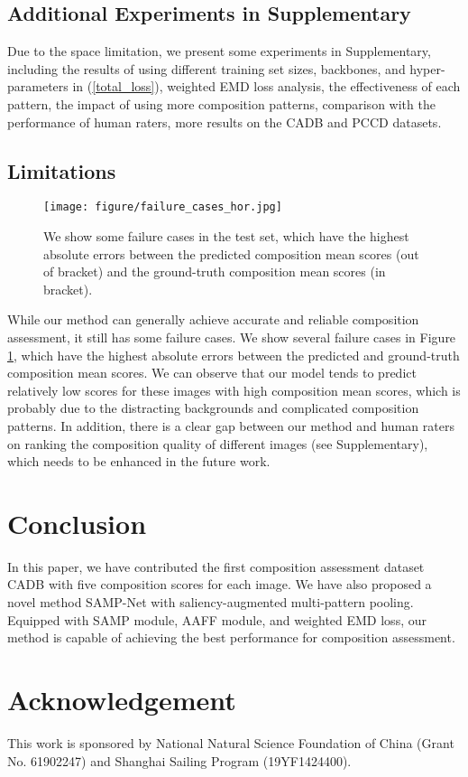 \documentclass{bmvc2k}
\begin{document}
\subsection{Additional Experiments in Supplementary}
Due to the space limitation, we present some experiments in Supplementary, including the results of using different training set sizes, backbones, and hyper-parameters  in  (\ref{total_loss}), weighted EMD loss analysis, the effectiveness of each pattern, the impact of using more composition patterns, comparison with the performance of human raters, more results on the CADB and PCCD \cite{Chang2017AestheticCG} datasets.
\vspace{-2mm}

\subsection{Limitations}
\label{sec:limitation}
\begin{figure}[tbp]
\begin{center}
  \texttt{[image: figure/failure\_cases\_hor.jpg]}
\end{center}
  \vspace{-6mm}
   \caption{We show some failure cases in the test set,  which have the highest absolute errors between the predicted composition mean scores (out of bracket) and the ground-truth composition mean scores (in bracket). }
  \vspace{-5mm}
\label{fig:failure_cases}
\end{figure}

\textcolor[rgb]{0,0,0}{While our method can generally achieve accurate and reliable composition assessment, it still has some failure cases. We show several failure cases in Figure \ref{fig:failure_cases}, which have the highest absolute errors between the predicted and ground-truth composition mean scores. We can observe that our model tends to predict relatively low scores for these images with high composition mean scores, which is probably due to the distracting backgrounds and complicated composition patterns. 
In addition, there is a clear gap between our method and human raters on ranking the composition quality of different images (see Supplementary), which needs to be enhanced in the  future work.
}
\vspace{-4mm}

\section{Conclusion}
In this paper, we have contributed the first composition assessment dataset CADB with five composition scores for each image. 
We have also proposed a novel method SAMP-Net with saliency-augmented multi-pattern pooling. Equipped with SAMP module, AAFF module, and weighted EMD loss, our method is capable of achieving the best performance for composition assessment.
\vspace{-4mm}
\section*{Acknowledgement}
This work is  sponsored by National Natural Science Foundation of China (Grant No. 61902247) and Shanghai Sailing Program (19YF1424400).


\end{document}

